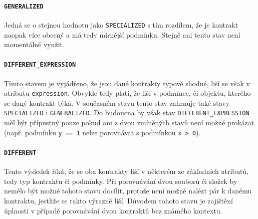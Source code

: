 						\paragraph{\texttt{GENERALIZED}}
							Jedná se o stejnou hodnotu jako \texttt{SPECIALIZED} s tím rozdílem, že je kontrakt naopak více obecný a má tedy mírnější podmínku. Stejně ani tento stav není momentálně využit.
							
						\paragraph{\texttt{DIFFERENT\_EXPRESSION}}
							Tímto stavem je vyjádřeno, že jsou dané kontrakty typově shodné, liší se však v atributu \texttt{expression}. Obvykle tedy platí, že liší v podmínce, či objektu, kterého se daný kontrakt týká. V současném stavu tento stav zahrnuje také stavy \texttt{SPECIALIZED} i \texttt{GENERALIZED}. Do budoucna by však stav \texttt{DIFFERENT\_EXPRESSION} měl být přípustný pouze pokud ani z dvou zmíněných stavů není možné prokázat (např. podmínku \texttt{y == 1} nelze porovnávat s podmínkou \texttt{x > 0}).
							
						\paragraph{\texttt{DIFFERENT}}
							Tento výsledek říká, že se oba kontrakty liší v některém ze základních atributů, tedy typ kontraktu či podmínky. Při porovnávání dvou souborů či složek by nemělo být možné tohoto stavu docílit, protože není možné nalézt pár k danému kontraktu, jestliže se takto výrazně liší. Důvodem tohoto stavu je zajištění úplnosti v případě porovnávání dvou kontraktů bez známého kontextu. 						 
							
